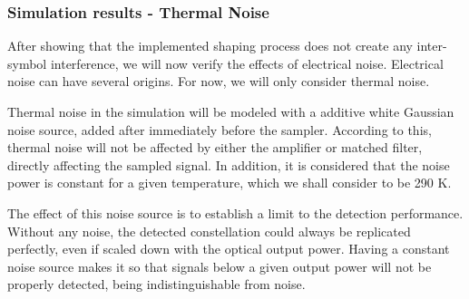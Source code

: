\subsubsection{Simulation results - Thermal 
Noise}\label{sec:simRes_thermalNoise}
After showing that the implemented shaping process does not create any 
inter-symbol interference, we will now verify the effects of electrical noise.
Electrical noise can  have several origins. For now, we will only consider 
thermal noise.

Thermal noise in the simulation will be modeled with a additive white Gaussian 
noise source, added after immediately before the sampler. According to this, 
thermal noise will not be affected by either the amplifier or matched filter, 
directly affecting the sampled signal. In addition, it is considered that the 
noise power is constant for a given temperature, which we shall consider to be 
290 K. 

The effect of this noise source is to establish a limit to the detection 
performance. Without any noise, the detected constellation could always be 
replicated perfectly, even if scaled down with the optical output power. Having 
a constant noise source makes it so that signals below a given output power 
will not be properly detected, being indistinguishable from noise.

